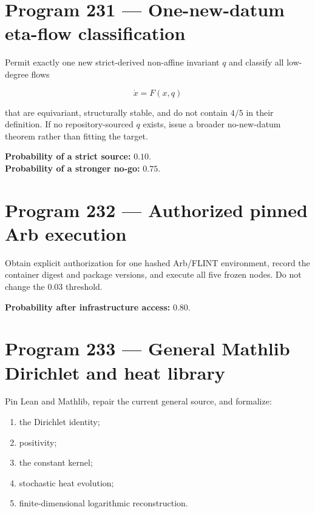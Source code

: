 \documentclass[11pt,a4paper,openany]{report}
\begin{document}
\section{Program 231 --- One-new-datum eta-flow classification}

Permit exactly one new strict-derived non-affine invariant \(q\) and classify all low-degree flows

\[
\dot x=F(x,q)
\]

that are equivariant, structurally stable, and do not contain \(4/5\) in their definition. If no repository-sourced \(q\) exists, issue a broader no-new-datum theorem rather than fitting the target.

\textbf{Probability of a strict source:} \(0.10\).\\
\textbf{Probability of a stronger no-go:} \(0.75\).

\section{Program 232 --- Authorized pinned Arb execution}

Obtain explicit authorization for one hashed Arb/\allowbreak{}FLINT environment, record the container digest and package versions, and execute all five frozen nodes. Do not change the \(0.03\) threshold.

\textbf{Probability after infrastructure access:} \(0.80\).

\section{Program 233 --- General Mathlib Dirichlet and heat library}

Pin Lean and Mathlib, repair the current general source, and formalize:

\begin{enumerate}
\item 
the Dirichlet identity;

\item 
positivity;

\item 
the constant kernel;

\item 
stochastic heat evolution;

\item 
finite-dimensional logarithmic reconstruction.

\end{enumerate}
\end{document}
